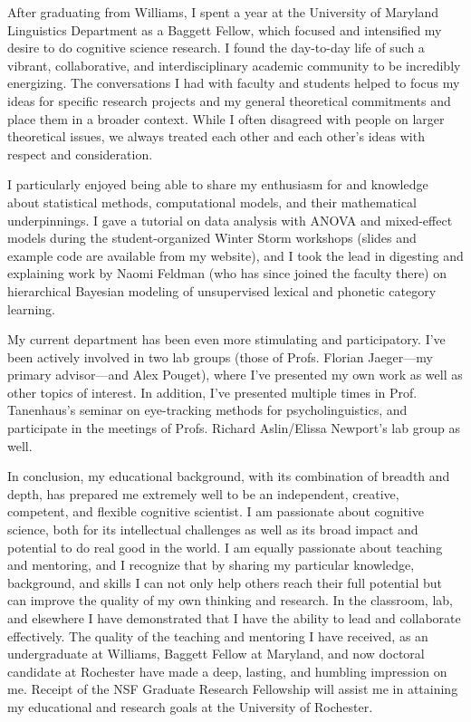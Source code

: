 \documentclass[12pt]{article}
\begin{document}

After graduating from Williams, I spent a year at the University of Maryland Linguistics Department as a Baggett Fellow, which focused and intensified my desire to do cognitive science research.  I found the day-to-day life of such a vibrant, collaborative, and interdisciplinary academic community to be incredibly energizing.  The conversations I had with faculty and students helped to focus my ideas for specific research projects and my general theoretical commitments and place them in a broader context.  While I often disagreed with people on larger theoretical issues, we always treated each other and each other's ideas with respect and consideration.  

I particularly enjoyed being able to share my enthusiasm for and knowledge about statistical methods, computational models, and their mathematical underpinnings.  I gave a tutorial on data analysis with ANOVA and mixed-effect models during the student-organized Winter Storm workshops (slides and example code are available from my website), and I took the lead in digesting and explaining work by Naomi Feldman (who has since joined the faculty there) on hierarchical Bayesian modeling of unsupervised lexical and phonetic category learning.

My current department has been even more stimulating and participatory.  I've been actively involved in two lab groups (those of Profs. Florian Jaeger---my primary advisor---and Alex Pouget), where I've presented my own work as well as other topics of interest.  In addition, I've presented multiple times in Prof. Tanenhaus's seminar on eye-tracking methods for psycholinguistics, and participate in the meetings of Profs. Richard Aslin/Elissa Newport's lab group as well.


In conclusion, my educational background, with its combination of breadth and depth, has prepared me extremely well to be an independent, creative, competent, and flexible cognitive scientist.  I am passionate about cognitive science, both for its intellectual challenges as well as its broad impact and potential to do real good in the world.  I am equally passionate about teaching and mentoring, and I recognize that by sharing my particular knowledge, background, and skills I can not only help others reach their full potential but can improve the quality of my own thinking and research.  In the classroom, lab, and elsewhere I have demonstrated that I have the ability to lead and collaborate effectively.  The quality of the teaching and mentoring I have received, as an undergraduate at Williams, Baggett Fellow at Maryland, and now doctoral candidate at Rochester have made a deep, lasting, and humbling impression on me.  Receipt of the NSF Graduate Research Fellowship will assist me in attaining my educational and research goals at the University of Rochester.



%
\end{document}
